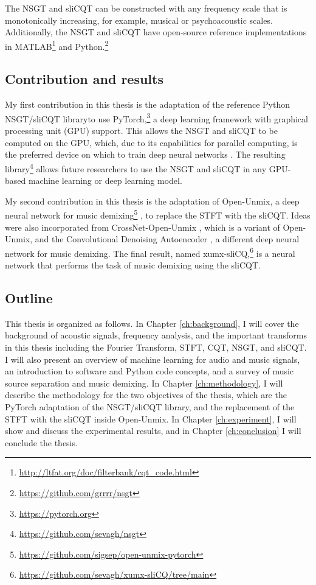\documentclass[report.tex]{subfiles}
\begin{document}
The NSGT and sliCQT can be constructed with any frequency scale that is monotonically increasing, for example, musical or psychoacoustic scales. Additionally, the NSGT and sliCQT have open-source reference implementations in MATLAB\footnote{\url{http://ltfat.org/doc/filterbank/cqt_code.html}} and Python.\footnote{\label{grnsgt}\url{https://github.com/grrrr/nsgt}}

\subsection{Contribution and results}

My first contribution in this thesis is the adaptation of the reference Python NSGT/sliCQT library to use PyTorch,\footnote{\url{https://pytorch.org}} a deep learning framework with graphical processing unit (GPU) support. This allows the NSGT and sliCQT to be computed on the GPU, which, due to its capabilities for parallel computing, is the preferred device on which to train deep neural networks \parencite{pytorch}. The resulting library\footnote{\url{https://github.com/sevagh/nsgt}} allows future researchers to use the NSGT and sliCQT in any GPU-based machine learning or deep learning model.

My second contribution in this thesis is the adaptation of Open-Unmix, a deep neural network for music demixing\footnote{\url{https://github.com/sigsep/open-unmix-pytorch}} \parencite{umx}, to replace the STFT with the sliCQT. Ideas were also incorporated from CrossNet-Open-Unmix \parencite{xumx}, which is a variant of Open-Unmix, and the Convolutional Denoising Autoencoder \parencite{plumbley1}, a different deep neural network for music demixing. The final result, named xumx-sliCQ,\footnote{\url{https://github.com/sevagh/xumx-sliCQ/tree/main}} is a neural network that performs the task of music demixing using the sliCQT.

\subsection{Outline}

This thesis is organized as follows. In Chapter \ref{ch:background}, I will cover the background of acoustic signals, frequency analysis, and the important transforms in this thesis including the Fourier Transform, STFT, CQT, NSGT, and sliCQT. I will also present an overview of machine learning for audio and music signals, an introduction to software and Python code concepts, and a survey of music source separation and music demixing. In Chapter \ref{ch:methodology}, I will describe the methodology for the two objectives of the thesis, which are the PyTorch adaptation of the NSGT/sliCQT library, and the replacement of the STFT with the sliCQT inside Open-Unmix. In Chapter \ref{ch:experiment}, I will show and discuss the experimental results, and in Chapter \ref{ch:conclusion} I will conclude the thesis.
\end{document}
